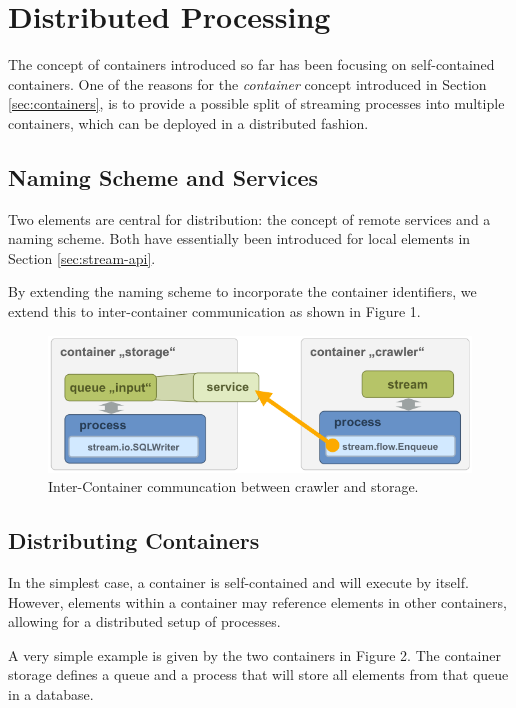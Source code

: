 \section{\label{sec:distributedProcessing}Distributed Processing}
The concept of containers introduced so far has been focusing on
self-contained containers. One of the reasons for the {\em container}
concept introduced in Section \ref{sec:containers}, is to provide a
possible split of streaming processes into multiple containers, which
can be deployed in a distributed fashion.

\subsection{Naming Scheme and Services}
Two elements are central for distribution: the concept of remote
services and a naming scheme. Both have essentially been introduced
for local elements in Section \ref{sec:stream-api}.

By extending the naming scheme to incorporate the container
identifiers, we extend this to inter-container communication as shown
in Figure 1.

\begin{figure}
  \begin{center}
    \includegraphics[scale=0.5]{graphics/remote-queue.png}
  \end{center}
  \caption{\label{fig:remote-queue}Inter-Container communcation between {\ttfamily crawler} and {\ttfamily storage.}}
\end{figure}


\subsection{Distributing Containers}
In the simplest case, a container is self-contained and will execute
by itself. However, elements within a container may reference elements
in other containers, allowing for a distributed setup of processes.

A very simple example is given by the two containers in Figure 2. The
container {\ttfamily storage} defines a queue and a process that will
store all elements from that queue in a database.

